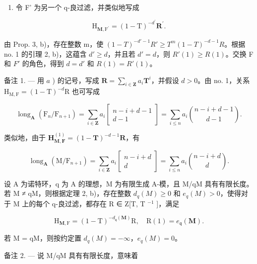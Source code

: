 \begin{enumerate}
\def\labelenumi{\alph{enumi})}
\setcounter{enumi}{1}
\tightlist
\item
  令 F' 为另一个 q-良过滤，并类似地写成
\end{enumerate}

\[
\mathrm{H} _ {\mathbf {M}, \mathrm{F} ^ {\prime}} = (1 - \mathrm{T}) ^ {- d ^ {\prime}} \mathbf {R} ^ {\prime}.
\]

由 Prop. 3, b)，存在整数 m，使 \((1 - T)^{-d'-1}R' \geqslant T^{m}(1 - T)^{-d-1}R\)。根据 no. 1 的引理 2, b)，这蕴含 \(d' \geqslant d\)，并且若 \(d' = d\)，则 \(R'(1) \geqslant R(1)\)。交换 F 和 \(F'\) 的角色，得到 \(d = d'\) 和 \(R(1) = R'(1)\)。

备注 1. --- 用 \(a\) ) 的记号，写成 \(\mathbf{R} = \sum_{i \in \mathbf{Z}} a_i \mathbf{T}^i\)，并假设 \(d > 0\)。由 no. 1，关系 \(\mathrm{H}_{\mathrm{M},\mathrm{F}} = (1 - \mathrm{T})^{-d}\mathrm{R}\) 也可写成

\[
\operatorname{long} _ {\mathbf {A}} \left(\mathrm{F} _ {n} / \mathrm{F} _ {n + 1}\right) = \sum_ {i \in \mathbf {Z}} a _ {i} \left[ \begin{array}{c} n - i + d - 1 \\ d - 1 \end{array} \right] = \sum_ {i \leqslant n} a _ {i} \binom {n - i + d - 1} {d - 1}.\tag{11}
\]

类似地，由于 \(\mathbf{H}_{\mathbf{M},\mathbf{F}}^{(1)} = (1 - \mathbf{T})^{-d - 1}\mathbf{R}\)，有

\[
\operatorname{long} _ {\mathbf {A}} \left(\mathrm{M} / \mathrm{F} _ {n + 1}\right) = \sum_ {i \in \mathbf {Z}} a _ {i} \left[ \begin{array}{c} n - i + d \\ d \end{array} \right] = \sum_ {i \leqslant n} a _ {i} \binom {n - i + d} {d}.\tag{12}
\]

设 A 为诺特环，q 为 A 的理想，M 为有限生成 A-模，且 M/qM 具有有限长度。若 M ≠ qM，则根据定理 2, b)，存在整数 \(d_{q}(M) \geqslant 0\) 和 \(e_{q}(M) > 0\)，使得对于 M 上的每个 q-良过滤，都存在 R ∈ Z{[}T, T \(^{-1}\) {]}，满足

\[
\mathrm{H} _ {\mathbf {M}, \mathrm{F}} = (1 - \mathrm{T}) ^ {- d _ {\mathfrak {q}} (\mathbf {M})} \mathrm{R}, \quad \mathrm{R} (1) = e _ {\mathfrak {q}} (\mathbf {M}).
\]

若 M = qM，则按约定置 \(d_{q}(M) = -\infty\)，\(e_{q}(M) = 0\)。

备注 2. --- 说 M/qM 具有有限长度，意味着

